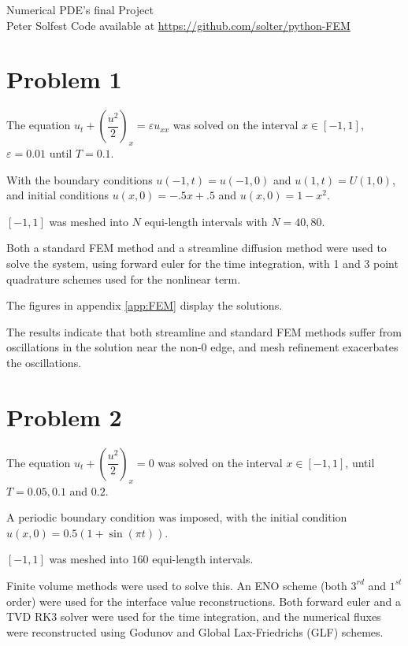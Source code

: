 \documentclass[10pt,letterpaper,fleqn]{article}
\begin{document}
\doublespacing

\begin{flushright}
Numerical PDE's final Project\\
Peter Solfest
Code available at \url{https://github.com/solter/python-FEM}
\end{flushright}


\section{Problem 1}
The equation $u_t + \left(\dfrac{u^2}{2}\right)_x = \varepsilon u_{xx}$ was solved on the interval $x \in [-1,1]$, $\varepsilon = 0.01$ until $T = 0.1$.

With the boundary conditions $u(-1,t) = u(-1,0)$ and $u(1,t) = U(1,0)$, and initial conditions $u(x,0) = -.5x + .5$ and $u(x,0) = 1 - x^2$.

$[-1,1]$ was meshed into $N$ equi-length intervals with $N = 40,80$.

Both a standard FEM method and a streamline diffusion method were used
to solve the system, using forward euler for the time integration,
with 1 and 3 point quadrature schemes used for the nonlinear term.

The figures in appendix \ref{app:FEM} display the solutions.

The results indicate that both streamline and standard FEM methods
suffer from oscillations in the solution near the non-0 edge, 
and mesh refinement exacerbates the oscillations.

\section{Problem 2}
The equation $u_t + \left(\dfrac{u^2}{2}\right)_x = 0$ was solved on the interval $x \in [-1,1]$, until $T = 0.05, 0.1$ and $0.2$.

A periodic boundary condition was imposed, with the initial condition
$u(x,0) = 0.5 (1 + \sin(\pi t))$.

$[-1,1]$ was meshed into $160$ equi-length intervals.

Finite volume methods were used to solve this.
An ENO scheme (both $3^{rd}$ and $1^{st}$ order) were used for
the interface value reconstructions.
Both forward euler and a TVD RK3 solver were used for the time integration,
and the numerical fluxes were reconstructed using Godunov and Global Lax-Friedrichs (GLF) schemes.
\end{document}
